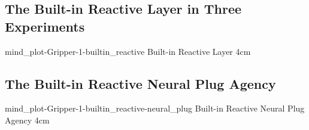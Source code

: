 {\clearpage
  \subsection{The Built-in Reactive Layer in Three Experiments}
  \experimentcausegroupplots{\dataappendixmaxtime}
                            {\dataappendixexperimentonemaxtime}
                            {\dataappendixexperimenttwomaxtime}
                            {\dataappendixexperimentthreemaxtime}
                            {\dataappendixexperimentonename}
                            {\dataappendixexperimenttwoname}
                            {\dataappendixexperimentthreename}
                            {\dataappendixexperimentoneprettyname}
                            {\dataappendixexperimenttwoprettyname}
                            \experimentcausegroupplotscontinued{\dataappendixexperimentthreeprettyname}
                                                               {mind_plot-Gripper-1-builtin_reactive}
                                                               {Built-in Reactive Layer}
                                                               {\experimentdatacommontablereference}
                                                               {4cm}
}
{\clearpage
  \subsection{The Built-in Reactive Neural Plug Agency}
  \experimentcausegroupplots{\dataappendixmaxtime}
                            {\dataappendixexperimentonemaxtime}
                            {\dataappendixexperimenttwomaxtime}
                            {\dataappendixexperimentthreemaxtime}
                            {\dataappendixexperimentonename}
                            {\dataappendixexperimenttwoname}
                            {\dataappendixexperimentthreename}
                            {\dataappendixexperimentoneprettyname}
                            {\dataappendixexperimenttwoprettyname}
                            \experimentcausegroupplotscontinued{\dataappendixexperimentthreeprettyname}
                                                               {mind_plot-Gripper-1-builtin_reactive-neural_plug}
                                                               {Built-in Reactive Neural Plug Agency}
                                                               {\experimentdatacommontablereference}
                                                               {4cm}
}
